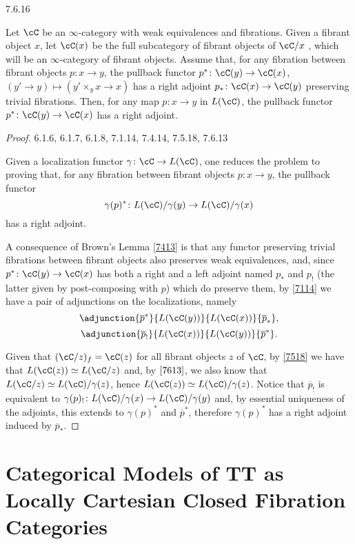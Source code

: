 \documentclass[a4paper,fontsize=12pt]{scrartcl}
\begin{document}
\begin{thm}\label{7616}
  7.6.16

  Let $\cC$ be an $\infty$-category with weak equivalences and fibrations. Given
  a fibrant object $x$, let $\cC(x)$ be the full subcategory of fibrant objects
  of $\cC/x$ , which will be an $\infty$-category of
  fibrant objects. Assume that, for any fibration between fibrant objects
  $p\colon x\rightarrow y$, the pullback functor
  $p^*\colon\cC(y)\rightarrow\cC(x)$, $(y'\rightarrow y)\mapsto(y'\times_y
  x\rightarrow x)$ has a right adjoint $p_*\colon\cC(x)\rightarrow\cC(y)$
  preserving trivial fibrations. Then, for any map $p\colon x\rightarrow y$ in
  $L(\cC)$, the pullback functor $p^*\colon\cC(y)\rightarrow\cC(x)$ has a right
  adjoint.
\end{thm}
\begin{proof}
  6.1.6, 6.1.7, 6.1.8, 7.1.14, 7.4.14, 7.5.18, 7.6.13

  Given a localization functor $\gamma\colon\cC\rightarrow L(\cC)$, one reduces
  the problem to proving that, for any fibration between fibrant objects
  $p\colon x\rightarrow y$, the pullback functor
  \[\gamma(p)^*\colon L(\cC)/\gamma(y)\rightarrow L(\cC)/\gamma(x)\]
  has a right adjoint.

  A consequence of Brown's Lemma \ref{7413} is that any functor preserving
  trivial fibrations between fibrant objects also preserves weak equivalences,
  and, since $p^*\colon\cC(y)\rightarrow\cC(x)$ has both a right and a left
  adjoint named $p_*$ and $p_!$ (the latter given by post-composing with $p$)
  which do preserve them, by \ref{7114} we have a pair of adjunctions on the
  localizations, namely
  \[\adjunction{\overline{p}^*}{L(\cC(y))}{L(\cC(x))}{\overline{p}_*},\]
  \[\adjunction{\overline{p}_!}{L(\cC(x))}{L(\cC(y))}{\overline{p}^*}.\]

  Given that $(\cC/z)_f=\cC(z)$ for all fibrant objects $z$ of $\cC$, by
  \ref{7518} we have that $L(\cC(z))\simeq L(\cC/z)$ and, by $\ref{7613}$, we
  also know that $L(\cC/z)\simeq L(\cC)/\gamma(z)$, hence $L(\cC(z))\simeq
  L(\cC)/\gamma(z)$. Notice that $\overline{p}_!$ is equivalent to
  $\gamma(p)_!\colon L(\cC)/\gamma(x)\rightarrow L(\cC)/\gamma(y)$ and, by
  essential uniqueness of the adjoints, this extends to $\gamma(p)^*$ and
  $\overline{p}^*$, therefore $\gamma(p)^*$ has a right adjoint induced by
  $\overline{p}_*$.
\end{proof}

\section{Categorical Models of TT as Locally Cartesian Closed Fibration
Categories}
\end{document}
